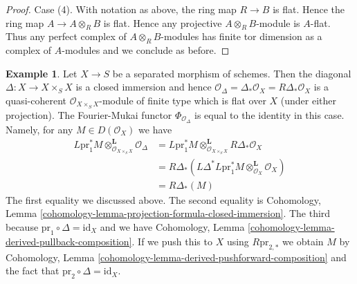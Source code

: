 \documentclass{stacks-project}
\theoremstyle{plain}
\theoremstyle{definition}
\newtheorem{example}[subsection]{Example}
\theoremstyle{remark}
\numberwithin{equation}{subsection}
\begin{document}
\begin{proof}
\medskip\noindent
Case (4). With notation as above, the ring map $R \to B$ is flat.
Hence the ring map $A \to A \otimes_R B$ is flat. Hence any projective
$A \otimes_R B$-module is $A$-flat. Thus any perfect complex of
$A \otimes_R B$-modules has finite tor dimension as a complex
of $A$-modules and we conclude as before.
\end{proof}

\begin{example}
\label{example-diagonal-fourier-mukai}
Let $X \to S$ be a separated morphism of schemes. Then the diagonal
$\Delta : X \to X \times_S X$ is a closed immersion and hence
$\mathcal{O}_\Delta = \Delta_*\mathcal{O}_X = R\Delta_*\mathcal{O}_X$
is a quasi-coherent $\mathcal{O}_{X \times_S X}$-module of finite type
which is flat over $X$ (under either projection). The Fourier-Mukai functor
$\Phi_{\mathcal{O}_\Delta}$ is equal to the identity in this case.
Namely, for any $M \in D(\mathcal{O}_X)$ we have
\begin{align*}
L\text{pr}_1^*M \otimes_{\mathcal{O}_{X \times_S X}}^\mathbf{L}
\mathcal{O}_\Delta
& =
L\text{pr}_1^*M \otimes_{\mathcal{O}_{X \times_S X}}^\mathbf{L}
R\Delta_*\mathcal{O}_X \\
& =
R\Delta_*(
L\Delta^*L\text{pr}_1^*M \otimes_{\mathcal{O}_X}^\mathbf{L} \mathcal{O}_X) \\
& =
R\Delta_*(M)
\end{align*}
The first equality we discussed above.
The second equality is Cohomology, Lemma
\ref{cohomology-lemma-projection-formula-closed-immersion}.
The third because $\text{pr}_1 \circ \Delta = \text{id}_X$ and we have
Cohomology, Lemma \ref{cohomology-lemma-derived-pullback-composition}.
If we push this to $X$ using $R\text{pr}_{2, *}$
we obtain $M$ by
Cohomology, Lemma \ref{cohomology-lemma-derived-pushforward-composition}
and the fact that $\text{pr}_2 \circ \Delta = \text{id}_X$.
\end{example}
\end{document}
